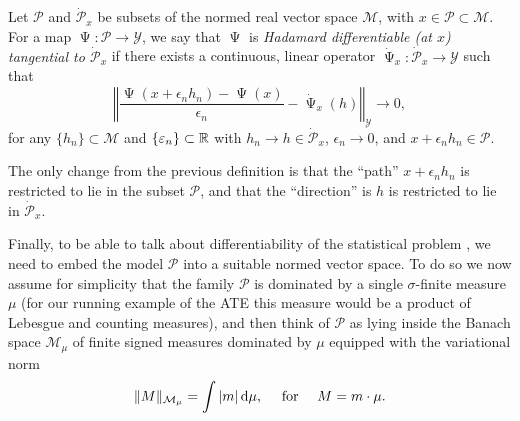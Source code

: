 \documentclass[a4,danish]{article}
\DeclareMathOperator{\TT}{\Psi}
\begin{document}
\begin{definition}
  Let $\mathcal{P}$ and $\dot{\mathcal{P}}_x$ be subsets of the normed real vector space
  $\mathcal{M}$, with $x \in \mathcal{P} \subset \mathcal{M}$. For a map
  $\TT \colon \mathcal{P} \rightarrow \mathcal{Y}$, we say that $\TT$ is \textit{Hadamard
    differentiable (at $x$) tangential to $\dot{\mathcal{P}}_x$} if there exists a continuous,
  linear operator $\dot{\TT}_x \colon \dot{\mathcal{P}}_x \rightarrow \mathcal{Y}$ such that
  \begin{equation*}
    \left\Vert
      \frac{\TT(x + \epsilon_n h_n) - \TT(x)}{\epsilon_n} - \dot{\TT}_x(h)
    \right\Vert_{\mathcal{Y}} \longrightarrow 0, 
  \end{equation*}
  for any $\{h_n\} \subset \mathcal{M}$ and $\{\varepsilon_n\} \subset \mathbb{R}$ with
  $h_n \rightarrow h \in \dot{\mathcal{P}}_x$, $\epsilon_n\rightarrow 0$, and
  $x + \epsilon_n h_n \in \mathcal{P}$.
\end{definition}

The only change from the previous definition is that the ``path'' $x + \epsilon_n h_n$ is restricted
to lie in the subset $\mathcal{P}$, and that the ``direction'' is $h$ is restricted to lie in
$\dot{\mathcal{P}}_x$.

Finally, to be able to talk about differentiability of the statistical problem \fxnote*{define this
  earlier}{$(\mathcal{P}, \TT)$}, we need to embed the model $\mathcal{P}$ into a suitable normed
vector space. To do so we now assume for simplicity that the family $\mathcal{P}$ is dominated by a
single $\sigma$-finite measure $\mu$ (for our running example of the ATE this measure would be a
product of Lebesgue and counting measures), and then think of $\mathcal{P}$ as lying inside the
Banach space $\mathcal{M}_{\mu}$ of finite signed measures dominated by $\mu$ equipped with the
variational norm
\begin{equation*}
  \Vert M \Vert_{\mathcal{M}_{\mu}} = \int |m |\mathop{}\!\mathrm{d} \mu, \quad \text{ for } \quad M = m \cdot \mu.
\end{equation*}
\end{document}
